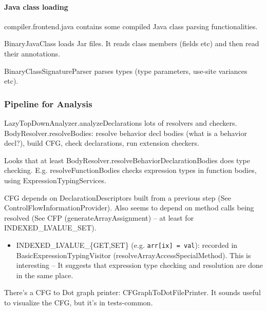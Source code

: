 \documentclass{article}
\begin{document}
\paragraph{Java class loading}

compiler.frontend.java contains some compiled Java class parsing functionalities.

BinaryJavaClass loads Jar files. It reads class members (fields etc) and then read their annotations.

BinaryClassSignatureParser parses types (type parameters, use-site variances etc).

\subsubsection{Pipeline for Analysis}

LazyTopDownAnalyzer.analyzeDeclarations \textSafeTo lots of resolvers and checkers.
BodyResolver.resolveBodies: resolve behavior decl bodies (what is a behavior decl?), build CFG, check declarations, run extension checkers.

Looks that at least BodyResolver.resolveBehaviorDeclarationBodies does type checking. E.g. resolveFunctionBodies checks expression types in function bodies, using ExpressionTypingServices.

CFG depends on DeclarationDescriptors built from a previous step (See ControlFlowInformationProvider). Also seems to depend on method calls being resolved (See CFP (generateArrayAssignment) -- at least for INDEXED\_LVALUE\_SET).

\begin{itemize}
    \item INDEXED\_LVALUE\_\{GET,SET\} (e.g. \texttt{arr[ix] = val}): recorded in BasicExpressionTypingVisitor (resolveArrayAccessSpecialMethod). This is interesting -- It suggests that expression type checking and resolution are done in the same place.
\end{itemize}

There's a CFG to Dot graph printer: CFGraphToDotFilePrinter. It sounds useful to visualize the CFG, but it's in tests-common.


\newpage
\printnomenclature
\end{document}
